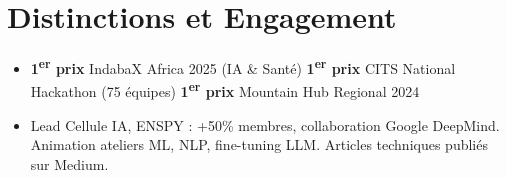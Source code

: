 \documentclass[a4paper,11pt]{article}
\begin{document}
\section{Distinctions et Engagement}
\begin{itemize}[leftmargin=*, nosep, label=\tiny$\bullet$]
    \item \small{\textbf{1\textsuperscript{er} prix} IndabaX Africa 2025 (IA \& Santé) \quad \textbf{1\textsuperscript{er} prix} CITS National Hackathon (75 équipes) \quad \textbf{1\textsuperscript{er} prix} Mountain Hub Regional 2024}
    \item \small{Lead Cellule IA, ENSPY : +50\% membres, collaboration Google DeepMind. Animation ateliers ML, NLP, fine-tuning LLM. Articles techniques publiés sur Medium.}
\end{itemize}
\end{document}
